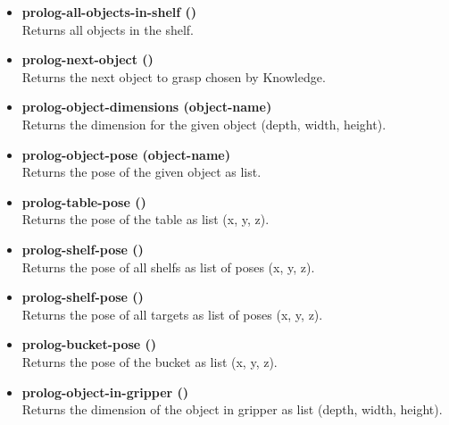 \documentclass[main.tex]{subfiles}
\begin{document}
\begin{itemize}
                \item \textbf{prolog-all-objects-in-shelf ()} \\ Returns all objects in the shelf.
                \item \textbf{prolog-next-object ()} \\ Returns the next object to grasp chosen by Knowledge.
            \item \textbf{prolog-object-dimensions (object-name)} \\ Returns the dimension for the given object (depth, width, height).
                \item \textbf{prolog-object-pose (object-name)} \\ Returns the pose of the given object as list.
                \item \textbf{prolog-table-pose ()} \\ Returns the pose of the table as list (x, y, z).
                \item \textbf{prolog-shelf-pose ()} \\ Returns the pose of all shelfs as list of poses (x, y, z).
                \item \textbf{prolog-shelf-pose ()} \\ Returns the pose of all targets as list of poses (x, y, z).
                \item \textbf{prolog-bucket-pose ()} \\ Returns the pose of the bucket as list (x, y, z).
                \item \textbf{prolog-object-in-gripper ()} \\ Returns the dimension of the object in gripper as list (depth, width, height).
            \end{itemize} 
\end{document}
